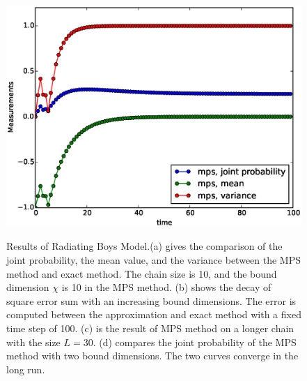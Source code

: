 \documentclass[english]{article}
\begin{document}
\begin{figure}[htbp]
{\includegraphics[scale=0.4]{Result_Fig/Radiating_MPS_t100_s30_bd10.eps}}\hfill
{}
  \caption{Results of Radiating Boys Model.(a) gives the comparison of the joint probability, the mean value, and the variance between the MPS method and exact method. The chain size is 10, and the bound dimension $\chi$ is 10 in the MPS method. (b) shows the decay of square error sum with an increasing bound dimensions. The error is computed between the approximation and exact method with a fixed time step of 100. (c) is the result of MPS method on a longer chain with the size $L=30$. (d) compares the joint probability of the MPS method with two bound dimensions. The two curves converge in the long run.}
  \label{fig:Radiating_result}
\end{figure}
\end{document}
